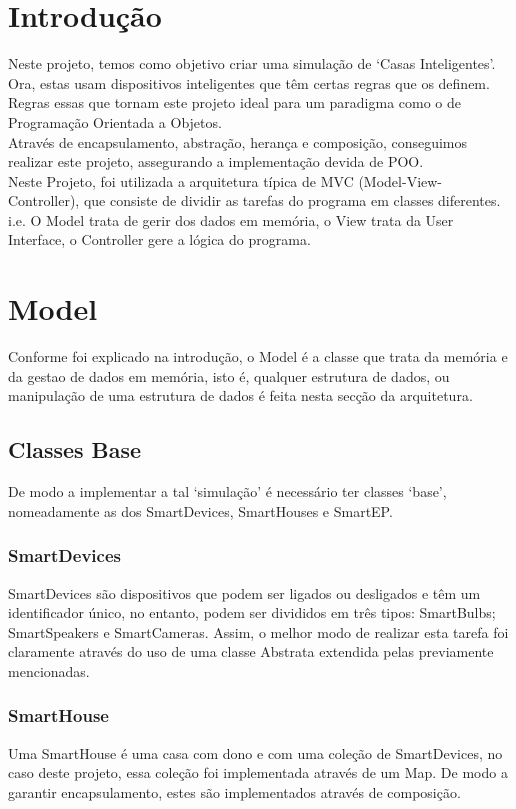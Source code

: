\documentclass[10pt, a4paper]{article}
\begin{document}
\section{Introdução}
        Neste projeto, temos como objetivo criar uma simulação de `Casas Inteligentes'.\@
        Ora, estas usam dispositivos inteligentes que têm certas regras que os definem. Regras essas que tornam este projeto ideal para um paradigma como
        o de Programação Orientada a Objetos.\\
        Através de encapsulamento, abstração, herança e composição, conseguimos realizar este projeto, assegurando a implementação devida de POO.\@
        \\ Neste Projeto, foi utilizada a arquitetura típica de MVC (Model-View-Controller), que consiste de dividir as tarefas do programa em classes diferentes.\@
        i.e. O Model trata de gerir dos dados em memória, o View trata da User Interface, o Controller gere a lógica do programa.\@
\section{Model}
        Conforme foi explicado na introdução, o Model é a classe que trata da memória e da gestao de dados em memória, isto é, qualquer estrutura de dados,
        ou manipulação de uma estrutura de dados é feita nesta secção da arquitetura.
\subsection{Classes Base}
        De modo a implementar a tal `simulação' é necessário ter classes `base', nomeadamente as dos SmartDevices, SmartHouses e SmartEP.\@
\subsubsection{SmartDevices}
        SmartDevices são dispositivos que podem ser ligados ou desligados e têm um identificador único, no entanto, podem ser divididos em três tipos:
        SmartBulbs; SmartSpeakers e SmartCameras.
        Assim, o melhor modo de realizar esta tarefa foi claramente através do uso de uma classe Abstrata extendida pelas previamente mencionadas.
\subsubsection{SmartHouse}
        Uma SmartHouse é uma casa com dono e com uma coleção de SmartDevices, no caso deste projeto, essa coleção foi implementada através de um Map.
        De modo a garantir encapsulamento, estes são implementados através de composição.
\end{document}
